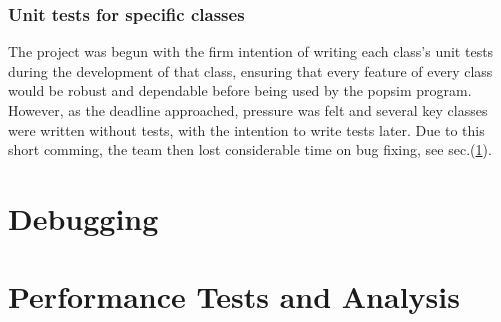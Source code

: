 \documentclass[12pt,a4paper]{article}
\begin{document}
\subsubsection{Unit tests for specific classes}
The project was begun with the firm intention of writing each class's unit tests during the development of that class, ensuring that every feature of every class would be robust and dependable before being used by the popsim program.  However, as the deadline approached, pressure was felt and several key classes were written without tests, with the intention to write tests later.
Due to this short comming, the team then lost considerable time on bug fixing, see sec.(\ref{Debugging}).
%


\section{Debugging}
\label{Debugging}




\section{Performance Tests and Analysis}
\label{Performance Tests and Analysis}
\end{document}
